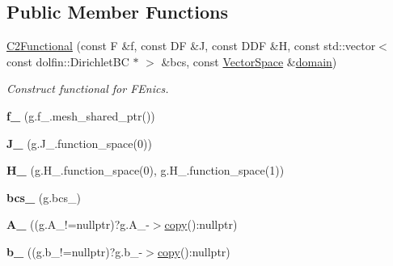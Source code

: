 \subsection*{\-Public \-Member \-Functions}
\begin{DoxyCompactItemize}
\item 
\hyperlink{classSpacy_1_1FEniCS_1_1C2Functional_a8f32c233a72dc3d25a656c1db12af943}{\-C2\-Functional} (const \-F \&f, const \-D\-F \&\-J, const \-D\-D\-F \&\-H, const std\-::vector$<$ const dolfin\-::\-Dirichlet\-B\-C $\ast$ $>$ \&bcs, const \hyperlink{classSpacy_1_1VectorSpace}{\-Vector\-Space} \&\hyperlink{classSpacy_1_1FunctionalBase_a2d3397deb9fa1ad85ed04e37a03b3aa6}{domain})
\begin{DoxyCompactList}\small\item\em \-Construct functional for \-F\-Enics. \end{DoxyCompactList}\item 
\hypertarget{classSpacy_1_1FEniCS_1_1C2Functional_a23b2069e46ad3ec938dfe271a5147238}{{\bfseries f\-\_\-} (g.\-f\-\_\-.\-mesh\-\_\-shared\-\_\-ptr())}\label{classSpacy_1_1FEniCS_1_1C2Functional_a23b2069e46ad3ec938dfe271a5147238}

\item 
\hypertarget{classSpacy_1_1FEniCS_1_1C2Functional_abd4b55ea517767411d5b45382fcde0e5}{{\bfseries \-J\-\_\-} (g.\-J\-\_\-.\-function\-\_\-space(0))}\label{classSpacy_1_1FEniCS_1_1C2Functional_abd4b55ea517767411d5b45382fcde0e5}

\item 
\hypertarget{classSpacy_1_1FEniCS_1_1C2Functional_aa2176d5bfd5ce7b51e35d5ef67b6914a}{{\bfseries \-H\-\_\-} (g.\-H\-\_\-.\-function\-\_\-space(0), g.\-H\-\_\-.\-function\-\_\-space(1))}\label{classSpacy_1_1FEniCS_1_1C2Functional_aa2176d5bfd5ce7b51e35d5ef67b6914a}

\item 
\hypertarget{classSpacy_1_1FEniCS_1_1C2Functional_a550ecb19a100f9d3bbc6ae7f6da3bc1b}{{\bfseries bcs\-\_\-} (g.\-bcs\-\_\-)}\label{classSpacy_1_1FEniCS_1_1C2Functional_a550ecb19a100f9d3bbc6ae7f6da3bc1b}

\item 
\hypertarget{classSpacy_1_1FEniCS_1_1C2Functional_a616112f0a96db8990be066d8a871b57c}{{\bfseries \-A\-\_\-} ((g.\-A\-\_\-!=nullptr)?g.\-A\-\_\--\/$>$\hyperlink{group__FenicsGroup_ga7f43f0c660d0646adb031b453c536bb0}{copy}()\-:nullptr)}\label{classSpacy_1_1FEniCS_1_1C2Functional_a616112f0a96db8990be066d8a871b57c}

\item 
\hypertarget{classSpacy_1_1FEniCS_1_1C2Functional_a1ef2bc828d1d94b2a0dc58a39f9e208a}{{\bfseries b\-\_\-} ((g.\-b\-\_\-!=nullptr)?g.\-b\-\_\--\/$>$\hyperlink{group__FenicsGroup_ga7f43f0c660d0646adb031b453c536bb0}{copy}()\-:nullptr)}\label{classSpacy_1_1FEniCS_1_1C2Functional_a1ef2bc828d1d94b2a0dc58a39f9e208a}


\end{DoxyCompactItemize}

